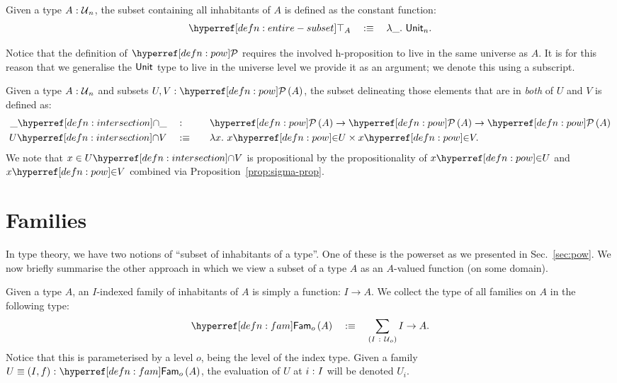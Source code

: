 \begin{defn}\label{defn:entire-subset}
  Given a type $A\hspace{0.1mm}:\hspace{0.1mm}\mathcal{U}{}_n$, the subset containing all inhabitants of $A$ is
  defined as the constant function:
  \begin{equation*}
    \entire{A} \quad\is\quad \lambda\_.~\unitty{}_n.
  \end{equation*}
\end{defn}

Notice that the definition of $\pownm{}$ requires the involved h-proposition to live in
the same universe as $A$. It is for this reason that we generalise the $\mathsf{Unit}{}$ type to
live in the universe level we provide it as an argument; we denote this using a subscript.

\begin{defn}\label{defn:intersection}
  Given a type $A\hspace{0.1mm}:\hspace{0.1mm}\mathcal{U}{}_n$ and subsets $\oftyII{U}{V}{\pow{A}}$, the subset
  delineating those elements that are in \emph{both} of $U$ and $V$ is defined as:
  \begin{alignat*}{2}
    \intersect{\_}{\_}  \quad&:\quad   && \pow{A} \rightarrow \pow{A} \rightarrow \pow{A}         \\
    \intersect{U}{V}    \quad&\is\quad && \lambda x.~ \mempow{x}{U} \times \mempow{x}{V} .
  \end{alignat*}
  We note that $x \in \intersect{U}{V}$ is propositional by the propositionality of
  $\mempow{x}{U}$ and $\mempow{x}{V}$ combined via Proposition~\ref{prop:sigma-prop}.
\end{defn}

\section{Families}\label{sec:fam}

In type theory, we have two notions of ``subset of inhabitants of a type''. One of these
is the powerset as we presented in Sec.~\ref{sec:pow}. We now briefly summarise the other
approach in which we view a subset of a type $A$ as an $A$-valued function (on some
domain).

\begin{defn}[Family]\label{defn:fam}
  Given a type $A$, an $I$-indexed family of inhabitants of $A$ is simply a function:
  $I \rightarrow A$. We collect the type of all families on $A$ in the following type:
  \begin{equation*}
    \sub{o}{A} \quad\is\quad \sigmaty{I}{\univ{}_o}{I \rightarrow A}.
  \end{equation*}
  Notice that this is parameterised by a level $o$, being the level of the index type.
  Given a family $\oftyI{U \equiv (I, f)}{\sub{o}{A}}$, the evaluation of $U$ at $i\hspace{0.1mm}:\hspace{0.1mm}I$
  will be denoted $U_i$.
\end{defn}

